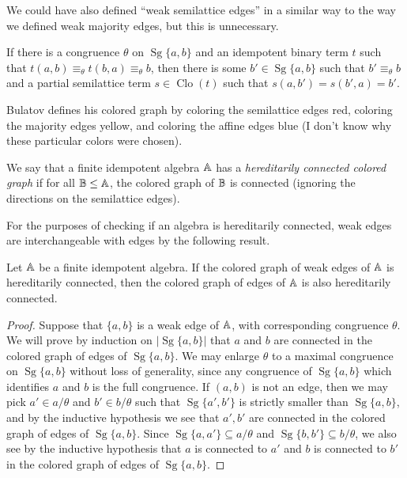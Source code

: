 \documentclass[letterpaper,11pt]{article}
\DeclareMathOperator{\Clo}{Clo}
\DeclareMathOperator{\Sg}{Sg}
\begin{document}
We could have also defined ``weak semilattice edges'' in a similar way to the way we defined weak majority edges, but this is unnecessary.

\begin{prop} If there is a congruence $\theta$ on $\Sg\{a,b\}$ and an idempotent binary term $t$ such that $t(a,b) \equiv_\theta t(b,a) \equiv_\theta b$, then there is some $b' \in \Sg\{a,b\}$ such that $b' \equiv_\theta b$ and a partial semilattice term $s \in \Clo(t)$ such that $s(a,b') = s(b',a) = b'$.
\end{prop}

Bulatov defines his colored graph by coloring the semilattice edges red, coloring the majority edges yellow, and coloring the affine edges blue (I don't know why these particular colors were chosen).

\begin{defn} We say that a finite idempotent algebra $\mathbb{A}$ has a \emph{hereditarily connected colored graph} if for all $\mathbb{B} \le \mathbb{A}$, the colored graph of $\mathbb{B}$ is connected (ignoring the directions on the semilattice edges).
\end{defn}

For the purposes of checking if an algebra is hereditarily connected, weak edges are interchangeable with edges by the following result.

\begin{prop} Let $\mathbb{A}$ be a finite idempotent algebra. If the colored graph of weak edges of $\mathbb{A}$ is hereditarily connected, then the colored graph of edges of $\mathbb{A}$ is also hereditarily connected.
\end{prop}
\begin{proof} Suppose that $\{a,b\}$ is a weak edge of $\mathbb{A}$, with corresponding congruence $\theta$. We will prove by induction on $|\Sg\{a,b\}|$ that $a$ and $b$ are connected in the colored graph of edges of $\Sg\{a,b\}$. We may enlarge $\theta$ to a maximal congruence on $\Sg\{a,b\}$ without loss of generality, since any congruence of $\Sg\{a,b\}$ which identifies $a$ and $b$ is the full congruence. If $(a,b)$ is not an edge, then we may pick $a' \in a/\theta$ and $b' \in b/\theta$ such that $\Sg\{a',b'\}$ is strictly smaller than $\Sg\{a,b\}$, and by the inductive hypothesis we see that $a',b'$ are connected in the colored graph of edges of $\Sg\{a,b\}$. Since $\Sg\{a,a'\} \subseteq a/\theta$ and $\Sg\{b,b'\} \subseteq b/\theta$, we also see by the inductive hypothesis that $a$ is connected to $a'$ and $b$ is connected to $b'$ in the colored graph of edges of $\Sg\{a,b\}$.
\end{proof}
\end{document}
